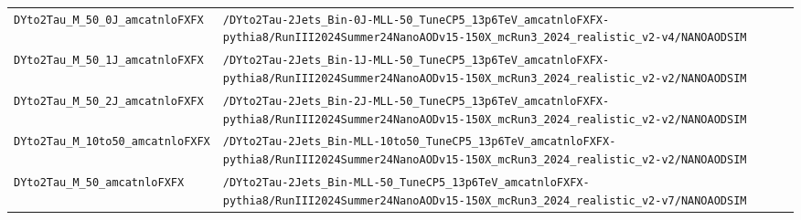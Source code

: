 \begin{longtable}{@{}>{\RaggedRight\arraybackslash}p{} >{\RaggedRight\arraybackslash}p{}@{}}
\addlinespace[2pt]
\texttt{DYto2Tau\_\allowbreak{}M\_\allowbreak{}50\_\allowbreak{}0J\_\allowbreak{}amcatnloFXFX} & \texttt{/\allowbreak{}DYto2Tau-\allowbreak{}2Jets\_\allowbreak{}Bin-\allowbreak{}0J-\allowbreak{}MLL-\allowbreak{}50\_\allowbreak{}TuneCP5\_\allowbreak{}13p6TeV\_\allowbreak{}amcatnloFXFX-\allowbreak{}pythia8/\allowbreak{}RunIII2024Summer24NanoAODv15-\allowbreak{}150X\_\allowbreak{}mcRun3\_\allowbreak{}2024\_\allowbreak{}realistic\_\allowbreak{}v2-\allowbreak{}v4/\allowbreak{}NANOAODSIM} \\
\addlinespace[2pt]
\texttt{DYto2Tau\_\allowbreak{}M\_\allowbreak{}50\_\allowbreak{}1J\_\allowbreak{}amcatnloFXFX} & \texttt{/\allowbreak{}DYto2Tau-\allowbreak{}2Jets\_\allowbreak{}Bin-\allowbreak{}1J-\allowbreak{}MLL-\allowbreak{}50\_\allowbreak{}TuneCP5\_\allowbreak{}13p6TeV\_\allowbreak{}amcatnloFXFX-\allowbreak{}pythia8/\allowbreak{}RunIII2024Summer24NanoAODv15-\allowbreak{}150X\_\allowbreak{}mcRun3\_\allowbreak{}2024\_\allowbreak{}realistic\_\allowbreak{}v2-\allowbreak{}v2/\allowbreak{}NANOAODSIM} \\
\addlinespace[2pt]
\texttt{DYto2Tau\_\allowbreak{}M\_\allowbreak{}50\_\allowbreak{}2J\_\allowbreak{}amcatnloFXFX} & \texttt{/\allowbreak{}DYto2Tau-\allowbreak{}2Jets\_\allowbreak{}Bin-\allowbreak{}2J-\allowbreak{}MLL-\allowbreak{}50\_\allowbreak{}TuneCP5\_\allowbreak{}13p6TeV\_\allowbreak{}amcatnloFXFX-\allowbreak{}pythia8/\allowbreak{}RunIII2024Summer24NanoAODv15-\allowbreak{}150X\_\allowbreak{}mcRun3\_\allowbreak{}2024\_\allowbreak{}realistic\_\allowbreak{}v2-\allowbreak{}v2/\allowbreak{}NANOAODSIM} \\
\addlinespace[2pt]
\texttt{DYto2Tau\_\allowbreak{}M\_\allowbreak{}10to50\_\allowbreak{}amcatnloFXFX} & \texttt{/\allowbreak{}DYto2Tau-\allowbreak{}2Jets\_\allowbreak{}Bin-\allowbreak{}MLL-\allowbreak{}10to50\_\allowbreak{}TuneCP5\_\allowbreak{}13p6TeV\_\allowbreak{}amcatnloFXFX-\allowbreak{}pythia8/\allowbreak{}RunIII2024Summer24NanoAODv15-\allowbreak{}150X\_\allowbreak{}mcRun3\_\allowbreak{}2024\_\allowbreak{}realistic\_\allowbreak{}v2-\allowbreak{}v2/\allowbreak{}NANOAODSIM} \\
\addlinespace[2pt]
\texttt{DYto2Tau\_\allowbreak{}M\_\allowbreak{}50\_\allowbreak{}amcatnloFXFX} & \texttt{/\allowbreak{}DYto2Tau-\allowbreak{}2Jets\_\allowbreak{}Bin-\allowbreak{}MLL-\allowbreak{}50\_\allowbreak{}TuneCP5\_\allowbreak{}13p6TeV\_\allowbreak{}amcatnloFXFX-\allowbreak{}pythia8/\allowbreak{}RunIII2024Summer24NanoAODv15-\allowbreak{}150X\_\allowbreak{}mcRun3\_\allowbreak{}2024\_\allowbreak{}realistic\_\allowbreak{}v2-\allowbreak{}v7/\allowbreak{}NANOAODSIM} \\

\end{longtable}

